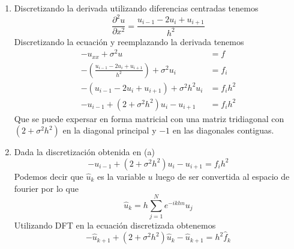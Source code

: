 \documentclass[spanish]{article}
\begin{document}
\begin{enumerate}
    \begin{enumerate}
        \item Discretizando la derivada utilizando diferencias centradas tenemos 
        \begin{equation}
           \frac{\partial^2 u}{\partial x^2} = \frac{u_{i-1} - 2u_i + u_{i+1}}{h^2}
        \end{equation}
        Discretizando la ecuación y reemplazando la derivada tenemos
        \begin{align}
            - u_{xx}  + \sigma^2 u &= f\\
            - (\frac{u_{i-1} - 2u_i + u_{i+1}}{h^2}) + \sigma^2 u_i &= f_i \\
            - (u_{i-1} - 2u_i + u_{i+1}) + \sigma^2h^2 u_i &= f_i h^2 \\
            - u_{i-1} + (2+\sigma^2h^2) u_i - u_{i+1}  &= f_i h^2 
        \end{align}
        Que se puede expersar en forma matricial con una matriz tridiagonal con $(2+\sigma^2h^2)$ en la diagonal principal y $-1$ en las diagonales contiguas. 
        
        \item Dada la discretización obtenida en (a)
        \begin{equation}
             - u_{i-1} + (2+\sigma^2h^2) u_i - u_{i+1} = f_i h^2
        \end{equation}
        Podemos decir que $ \hat{u}_k$ es la variable $u$ luego de ser convertida al espacio de fourier por lo que 
        \begin{equation}
            \hat{u}_k = h \sum_{j = 1}^{N} e^{-ikhn} u_j
        \end{equation}
        Utilizando DFT en la ecuación discretizada obtenemos
        \begin{equation}
            - \hat{u}_{k+1} + (2+\sigma^2h^2) \hat{u}_k - \hat{u}_{k+1} = h^2\hat{f}_k
        \end{equation}
        

\end{enumerate}
\end{enumerate}
\end{document}
